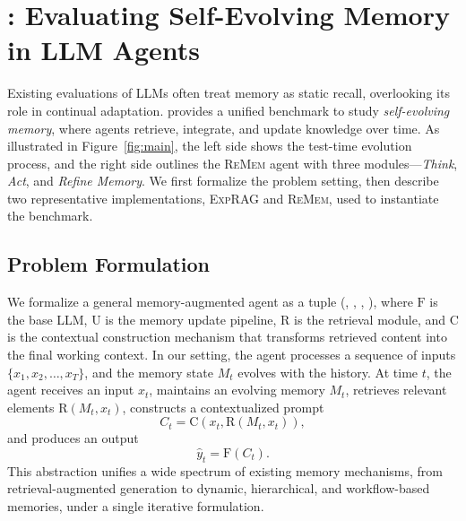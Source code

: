 \section{\protect\method: Evaluating Self-Evolving Memory in LLM Agents}
\label{sec:method}

Existing evaluations of LLMs often treat memory as static recall, overlooking its role in continual adaptation. 
\method provides a unified benchmark to study \emph{self-evolving memory}, where agents retrieve, integrate, and update knowledge over time. 
As illustrated in Figure~\ref{fig:main}, the left side shows the test-time evolution process, and the right side outlines the \textsc{ReMem} agent with three modules—\emph{Think}, \emph{Act}, and \emph{Refine Memory}. 
We first formalize the problem setting, then describe two representative implementations, \textsc{ExpRAG} and \textsc{ReMem}, used to instantiate the benchmark.



\subsection{Problem Formulation}


We formalize a general memory-augmented agent as a tuple
(, , , ), 
where \(\text{F}\) is the base LLM, \(\text{U}\) is the memory update pipeline, \(\text{R}\) is the retrieval module, and \(\text{C}\) is the contextual construction mechanism that transforms retrieved content into the final working context. In our setting, the agent processes a sequence of inputs \(\{x_1, x_2, \ldots, x_T\}\), and the memory state \(M_t\) evolves with the history. At time \(t\), the agent receives an input \(x_t\), maintains an evolving memory \(M_t\), retrieves relevant elements \(\text{R}(M_t, x_t)\), constructs a contextualized prompt 
\[
C_t = \text{C}(x_t, \text{R}(M_t, x_t)),
\]
and produces an output 
\[
\hat{y}_t = \text{F}(C_t).
\]
This abstraction unifies a wide spectrum of existing memory mechanisms, from retrieval-augmented generation to dynamic, hierarchical, and workflow-based memories, under a single iterative formulation.



